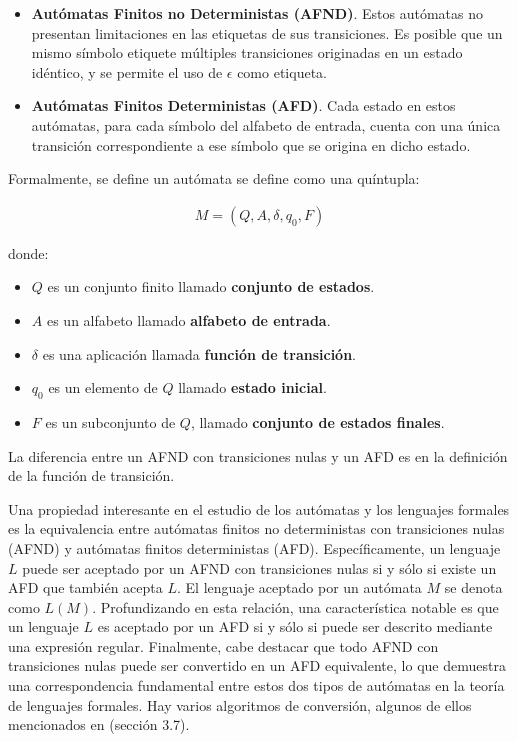 \begin{itemize}
    \item \textbf{Autómatas Finitos no Deterministas (AFND)}. Estos autómatas no presentan limitaciones en las etiquetas de sus transiciones. Es posible que un mismo símbolo etiquete múltiples transiciones originadas en un estado idéntico, y se permite el uso de $\epsilon$ como etiqueta.
    \item \textbf{Autómatas Finitos Deterministas (AFD)}. Cada estado en estos autómatas, para cada símbolo del alfabeto de entrada, cuenta con una única transición correspondiente a ese símbolo que se origina en dicho estado.
\end{itemize}

\noindent
Formalmente, se define un autómata se define como una quíntupla:

\begin{align*}
    M = (Q,A,\delta,q_0,F)
\end{align*}

\noindent
donde:
\begin{itemize}
    \item $Q$ es un conjunto finito llamado \textbf{conjunto de estados}.
    \item $A$ es un alfabeto llamado \textbf{alfabeto de entrada}.
    \item $\delta$ es una aplicación llamada \textbf{función de transición}.
    \item $q_0$ es un elemento de $Q$ llamado \textbf{estado inicial}.
    \item $F$ es un subconjunto de $Q$, llamado \textbf{conjunto de estados finales}.
\end{itemize}

La diferencia entre un AFND con transiciones nulas y un AFD es en la definición de la función de transición.

Una propiedad interesante en el estudio de los autómatas y los lenguajes formales es la equivalencia entre autómatas finitos no deterministas con transiciones nulas (AFND) y autómatas finitos deterministas (AFD). Específicamente, un lenguaje $L$ puede ser aceptado por un AFND con transiciones nulas si y sólo si existe un AFD que también acepta $L$. El lenguaje aceptado por un autómata $M$ se denota como $L(M)$. Profundizando en esta relación, una característica notable es que un lenguaje $L$ es aceptado por un AFD si y sólo si puede ser descrito mediante una expresión regular. Finalmente, cabe destacar que todo AFND con transiciones nulas puede ser convertido en un AFD equivalente, lo que demuestra una correspondencia fundamental entre estos dos tipos de autómatas en la teoría de lenguajes formales. Hay varios algoritmos de conversión, algunos de ellos mencionados en \cite{aho1990compiladores} (sección 3.7).

